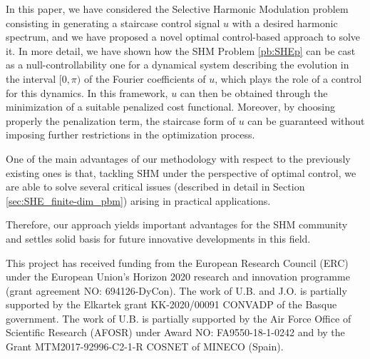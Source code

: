 \documentclass[twocolumn]{autart}    %
\begin{document}
In this paper, we have considered the Selective Harmonic Modulation problem consisting in generating a staircase control signal $u$ with a desired harmonic spectrum, and we have proposed a novel optimal control-based approach to solve it. In more detail, we have shown how the SHM Problem \eqref{pb:SHEp} can be cast as a null-controllability one for a dynamical system describing the evolution in the interval $[0,\pi)$ of the Fourier coefficients of $u$, which plays the role of a control for this dynamics. In this framework, $u$ can then be obtained through the minimization of a suitable penalized cost functional. Moreover, by choosing properly the penalization term, the staircase form of $u$ can be guaranteed without imposing further restrictions in the optimization process. 

One of the main advantages of our methodology with respect to the previously existing ones is that, tackling SHM under the perspective of optimal control, we are able to solve several critical issues (described in detail in Section \ref{sec:SHE_finite-dim_pbm}) arising in practical applications. 

Therefore, our approach yields important advantages for the SHM community and settles solid basis for future innovative developments in this field.

\begin{ack}            
This project has received funding from the European Research Council (ERC) under the European Union’s Horizon 2020 research and innovation programme (grant agreement NO: 694126-DyCon). The work of U.B. and J.O. is partially supported by the Elkartek grant KK-2020/00091 CONVADP of the Basque government. The work of U.B. is partially supported by the Air Force Office of Scientific Research (AFOSR) under Award NO: FA9550-18-1-0242 and by the Grant MTM2017-92996-C2-1-R COSNET of MINECO (Spain).
\end{ack}
 


 
\end{document}
